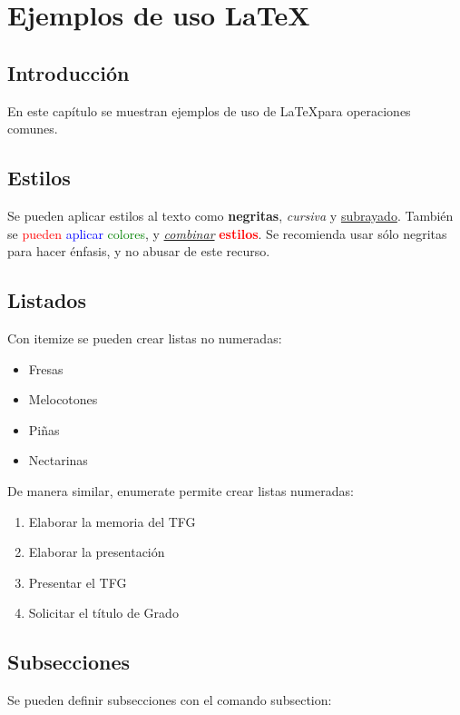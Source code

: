 \chapter{Ejemplos de uso LaTeX}\label{cap:ejemplos}


\section{Introducción}
En este capítulo se muestran ejemplos de uso de \LaTeX para operaciones comunes. 

\section{Estilos}\label{sec:estilos}
Se pueden aplicar estilos al texto como \textbf{negritas}, \textit{cursiva} y \underline{subrayado}. También se \textcolor{red}{pueden} \textcolor{blue}{aplicar} \textcolor{green}{colores}, y \underline{\textit{combinar}} \textbf{\textcolor{red}{estilos}}. Se recomienda usar sólo negritas para hacer énfasis, y no abusar de este recurso.

\section{Listados}
Con itemize se pueden crear listas no numeradas:

\begin{itemize}
    \item Fresas
    \item Melocotones
    \item Piñas
    \item Nectarinas
\end{itemize}

De manera similar, enumerate permite crear listas numeradas:

\begin{enumerate}
    \item Elaborar la memoria del TFG
    \item Elaborar la presentación
    \item Presentar el TFG
    \item Solicitar el título de Grado
\end{enumerate}

\section{Subsecciones}
Se pueden definir subsecciones con el comando subsection:

